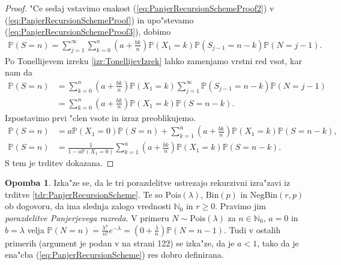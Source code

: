 \documentclass[12pt, a4paper, reqno]{amsart}
\theoremstyle{definition}
\newtheorem{opomba}[definicija]{Opomba}
\theoremstyle{plain}
\newcommand{\N}{\mathbb{N}}
\newcommand{\Prob}{\mathbb{P}}
\newcommand{\1}{\mathds{1}}
\newcommand{\Pois}[1]{\text{Pois}(#1)}
\newcommand*{\refPriloga}[1]{%
  \begingroup
    \hypersetup{
      linkcolor=red,
      linkbordercolor=red,
    }%
    \ref{#1}%
  \endgroup
}
\begin{document}
\begin{proof}
        \pagebreak
        \noindent
        "Ce sedaj vstavimo enakost (\ref{eq:PanjerRecursionSchemeProof2}) v (\ref{eq:PanjerRecursionSchemeProof}) 
        in upo"stevamo (\ref{eq:PanjerRecursionSchemeProof3}), dobimo
        \begin{align*}
            \Prob(S = n)
                = \sum_{j = 1}^\infty\sum_{k = 0}^n \left(a + \frac{bk}{n}\right)\Prob\left(X_1 = k\right)\Prob\left(S_{j - 1} = n - k\right)\Prob\left(N = j - 1\right).
        \end{align*}
        Po Tonellijevem izreku \refPriloga{izr:TonellijevIzrek} lahko zamenjamo vrstni red vsot, kar nam da
        \begin{align*}
            \Prob(S = n) 
                &= \sum_{k = 0}^n\left(a + \frac{bk}{n}\right)\Prob\left(X_1 = k\right)\sum_{j = 1}^\infty\Prob\left(S_{j - 1} = n - k\right)\Prob\left(N = j - 1\right)\\
                &= \sum_{k = 0}^n\left(a + \frac{bk}{n}\right)\Prob\left(X_1 = k\right)\Prob\left(S = n - k\right).
        \end{align*}
        Izpostavimo prvi "clen vsote in izraz preoblikujemo.
        \begin{align*}
            \Prob(S = n) 
                &= a\Prob\left(X_1 = 0\right)\Prob\left(S = n\right) + \sum_{k = 1}^n\left(a + \frac{bk}{n}\right)\Prob\left(X_1 = k\right)\Prob\left(S = n - k\right), \\
            \Prob(S = n)
                &= \frac{1}{1 - a\Prob\left(X_1 = 0\right)}\sum_{k = 1}^n\left(a + \frac{bk}{n}\right)\Prob\left(X_1 = k\right)\Prob\left(S = n - k\right).
        \end{align*}
        S tem je trditev dokazana.
    \end{proof}

    \begin{opomba}
        Izka"ze se, da le tri porazdelitve 
        ustrezajo rekurzivni izra"zavi iz trditve \ref{tdr:PanjerRecursionScheme}. Te so $\Pois{\lambda}$, $\text{Bin}(p)$ in
        $\text{NegBin}(r, p)$ ob dogovoru, da ima slednja zalogo vrednosti $\N_0$ in $r\geq0$. Pravimo jim \textit{porazdelitve Panjerjevega razreda}. 
        V primeru $N\sim\Pois{\lambda}$ za $n\in\N_0$, $a = 0$ in $b = \lambda$ velja $\Prob\left(N = n\right) = \frac{\lambda^n}{n!}e^{-\lambda} = 
        \left(0 + \frac{\lambda}{n}\right)\Prob\left(N = n - 1\right)$. 
        Tudi v ostalih primerih (argument je podan v \cite{4} na strani 122) se izka"ze, da je $a < 1$, tako da je 
        ena"cba (\ref{eq:PanjerRecursionScheme}) res dobro definirana.
        \label{op:PanjerRazsiritev}
    \end{opomba}
\end{document}
